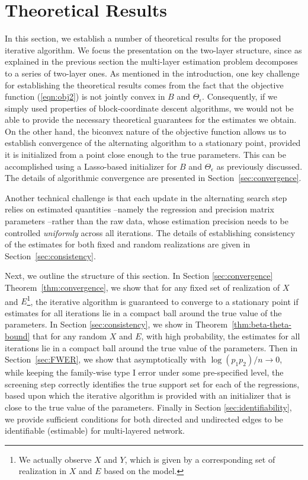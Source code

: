 
%
%

\section{Theoretical Results} \label{sec:Theory}

In this section, we establish a number of theoretical results for the proposed iterative algorithm. We focus the presentation on the two-layer structure,
since as explained in the previous section the multi-layer estimation problem decomposes to a series of two-layer ones. 
As mentioned in the introduction, one key challenge for establishing the theoretical results comes from the fact that the objective function (\ref{eqn:obj2}) is not jointly convex in $B$ and $\Theta_\epsilon$. Consequently, if we simply used properties of block-coordinate descent algorithms, we would not be able to provide the necessary theoretical guarantees for the estimates we obtain. On the other hand, the biconvex nature of the objective function allows
us to establish convergence of the alternating algorithm to a stationary point, provided it is initialized from a point close enough to the true parameters.
This can be accomplished using a Lasso-based initializer for $B$ and $\Theta_\epsilon$ as previously discussed. The details of algorithmic convergence 
are presented in Section~\ref{sec:convergence}.

Another technical challenge is that each update in the alternating search step relies on estimated quantities --namely the regression and precision matrix parameters --rather than the raw data, whose estimation precision needs to be controlled {\em uniformly} across all iterations. The details of establishing
consistency of the estimates for both fixed and random realizations are given in Section~\ref{sec:consistency}. 

Next, we outline the structure of this section. In Section \ref{sec:convergence} Theorem~\ref{thm:convergence}, we show that for any fixed set of realization of $X$ and $E$\footnote{We actually observe $X$ and $Y$, which is given by a corresponding set of realization in $X$ and $E$ based on the model.}, the iterative algorithm is guaranteed to converge to a stationary point if estimates for all iterations lie in a compact ball around the true value of the parameters. In Section \ref{sec:consistency}, we show in Theorem~\ref{thm:beta-theta-bound} that for any random $X$ and $E$, with high probability, the estimates for all iterations lie in a compact ball around the true value of the parameters. Then in Section~\ref{sec:FWER}, we show that asymptotically with $\log(p_1p_2)/n\rightarrow 0$, while keeping the family-wise type I error under some pre-specified level, the screening step correctly identifies the true support set for each of the regressions, based upon which the iterative algorithm is provided with an initializer that is close to the true value of the parameters. Finally in Section \ref{sec:identifiability}, we provide sufficient conditions for both directed and undirected edges to be 
identifiable (estimable) for multi-layered network. 

